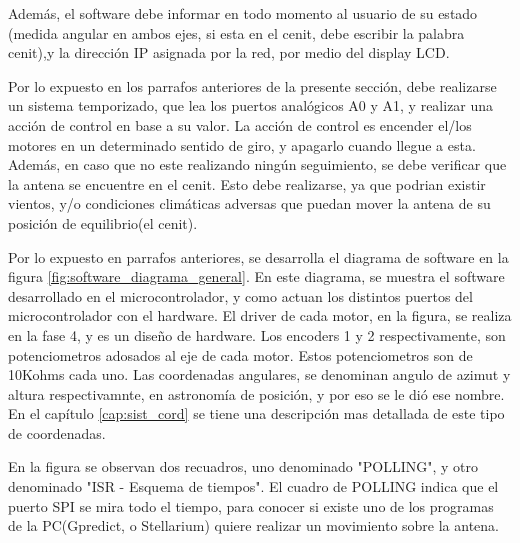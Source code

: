 Además, el software debe informar en todo momento al usuario de su estado (medida angular en ambos ejes, si esta en el cenit, debe escribir la palabra cenit),y la dirección IP asignada por la red, por medio del display LCD.  

Por lo expuesto en los parrafos anteriores de la presente sección, debe realizarse un sistema temporizado, que lea los puertos analógicos A0 y A1, y realizar una acción de control en base a su valor. La acción de control es encender el/los motores en un determinado sentido de giro, y apagarlo cuando llegue a esta. Además, en caso que no este realizando ningún seguimiento, se debe verificar que la antena se encuentre en el cenit. Esto debe realizarse, ya que podrian existir vientos, y/o condiciones climáticas adversas que puedan mover la antena de su posición de equilibrio(el cenit). 


Por lo expuesto en parrafos anteriores, se desarrolla el diagrama de software en la figura  \ref{fig:software_diagrama_general}. En este diagrama, se muestra el software desarrollado en el microcontrolador, y como actuan los distintos puertos del microcontrolador con el hardware. El driver de cada motor, en la figura, se realiza en la fase 4, y es un diseño de hardware. Los encoders 1 y 2 respectivamente, son potenciometros adosados al eje de cada motor. Estos potenciometros son de 10Kohms cada uno. Las coordenadas angulares, se denominan angulo de azimut y altura respectivamnte, en astronomía de posición, y por eso se le dió ese nombre. En el capítulo \ref{cap:sist_cord} se tiene una descripción mas detallada de este tipo de coordenadas. 

En la figura se observan dos recuadros, uno denominado "POLLING", y otro denominado "ISR - Esquema de tiempos". El cuadro de POLLING indica que el puerto SPI se mira todo el tiempo, para conocer si existe uno de los programas de la PC(Gpredict, o Stellarium) quiere realizar un movimiento sobre la antena. 


